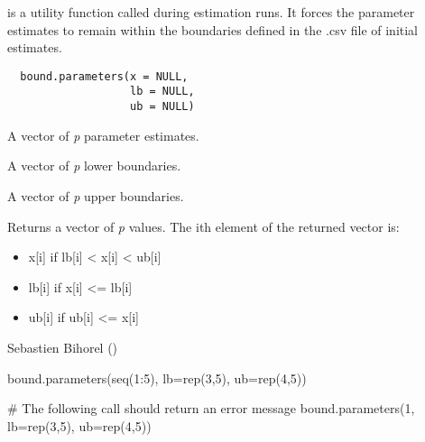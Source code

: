 %
\begin{Description}\relax
{} is a utility function called during estimation runs. It forces the parameter
estimates to remain within the boundaries defined in the .csv file of initial estimates.
\end{Description}
%
\begin{Usage}
\begin{verbatim}
  bound.parameters(x = NULL,
                   lb = NULL,
                   ub = NULL)
\end{verbatim}
\end{Usage}
%
\begin{Arguments}
\begin{ldescription}
\item[\code{x}] A vector of \emph{p} parameter estimates.
\item[\code{lb}] A vector of \emph{p} lower boundaries.
\item[\code{ub}] A vector of \emph{p} upper boundaries.
\end{ldescription}
\end{Arguments}
%
\begin{Value}
Returns a vector of \emph{p} values. The ith element of the returned vector is: \begin{itemize}

\item x[i]  if lb[i] < x[i] < ub[i]
\item lb[i] if x[i] <= lb[i]
\item ub[i] if ub[i] <= x[i]

\end{itemize}

\end{Value}
%
\begin{Author}\relax
Sebastien Bihorel ()
\end{Author}
%
\begin{Examples}
\begin{ExampleCode}

bound.parameters(seq(1:5), lb=rep(3,5), ub=rep(4,5))

# The following call should return an error message
bound.parameters(1, lb=rep(3,5), ub=rep(4,5))

\end{ExampleCode}
\end{Examples}

